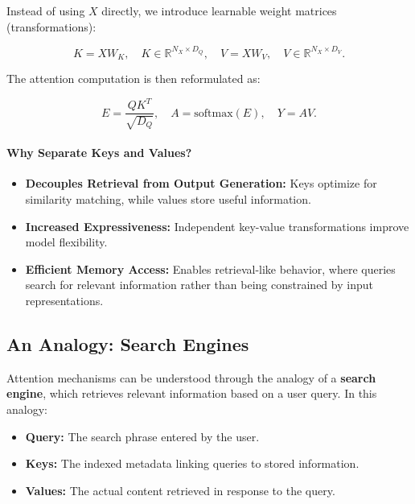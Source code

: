 \noindent Instead of using \( X \) directly, we introduce learnable weight matrices (transformations):

\begin{equation}
    K = X W_K, \quad K \in \mathbb{R}^{N_X \times D_Q}, \quad V = X W_V, \quad V \in \mathbb{R}^{N_X \times D_V}.
\end{equation}

\noindent The attention computation is then reformulated as:

\begin{equation}
    E = \frac{Q K^T}{\sqrt{D_Q}}, \quad A = \text{softmax}(E), \quad Y = A V.
\end{equation}

\paragraph{Why Separate Keys and Values?}
\begin{itemize}
    \item \textbf{Decouples Retrieval from Output Generation:} Keys optimize for similarity matching, while values store useful information.
    \item \textbf{Increased Expressiveness:} Independent key-value transformations improve model flexibility.
    \item \textbf{Efficient Memory Access:} Enables retrieval-like behavior, where queries search for relevant information rather than being constrained by input representations.
\end{itemize}

\subsection{An Analogy: Search Engines}
\label{sec:chapter17_search_engine_analogy}

\noindent Attention mechanisms can be understood through the analogy of a \textbf{search engine}, which retrieves relevant information based on a user query. In this analogy:

\begin{itemize}
    \item \textbf{Query:} The search phrase entered by the user.
    \item \textbf{Keys:} The indexed metadata linking queries to stored information.
    \item \textbf{Values:} The actual content retrieved in response to the query.
\end{itemize}

